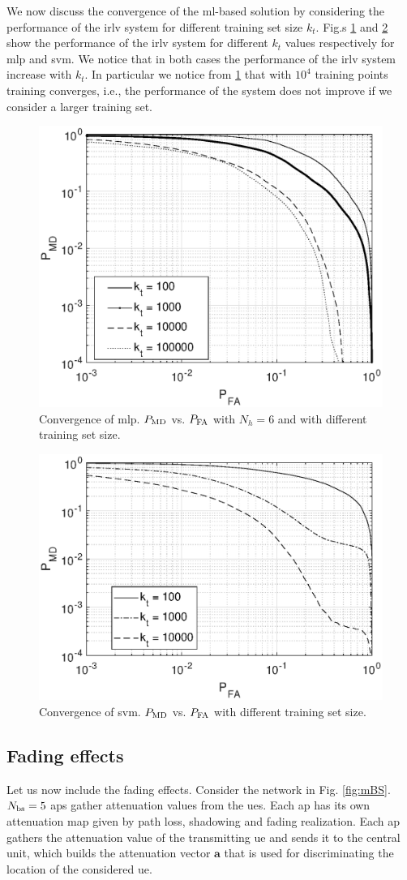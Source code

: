 \documentclass[draftcls,onecolumn,12pt]{IEEEtran}
\begin{document}
We now discuss the convergence of the \ac{ml}-based solution by considering the performance of the \ac{irlv} system for different training set size $k_t$. Fig.s \ref{fig:trainMLP} and \ref{fig:trainSVM} show the performance of the \ac{irlv} system for different $k_t$ values respectively for \ac{mlp} and \ac{svm}. We notice that in both cases the performance of the \ac{irlv} system increase with $k_t$. In particular we notice from \ref{fig:trainMLP} that with $10^4$ training points training converges, i.e., the performance of the system does not improve if we consider a larger training set.

\begin{figure}[t]
    \centering
    \includegraphics[width=0.5\columnwidth]{res_avg_nTrain.eps}
    \caption{Convergence of \ac{mlp}. $P_{\rm MD}$ vs. $P_{\rm FA}$ with $N_h = 6$ and with different training set size.}
    \label{fig:trainMLP}
\end{figure}


\begin{figure}[t]
    \centering
    \includegraphics[width=0.5\columnwidth]{res_avg_nTrain_SVM.eps}
    \caption{Convergence of \ac{svm}. $P_{\rm MD}$ vs. $P_{\rm FA}$  with different training set size.}
    \label{fig:trainSVM}
\end{figure}


\subsection{Fading effects}\label{sec:res_fading}
Let us now include the fading effects. Consider the network in Fig. \ref{fig:mBS}. $N_{\rm bs}=5$ \acp{ap} gather attenuation values from the \acp{ue}. Each \ac{ap} has its own attenuation map given by path loss, shadowing and fading realization. Each \ac{ap} gathers the attenuation value of the transmitting \ac{ue} and sends it to the central unit, which builds the attenuation vector $\bm{a}$ that is used for discriminating the location of the considered \ac{ue}.
\end{document}
